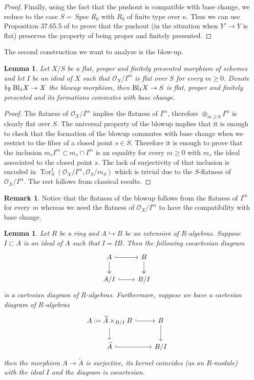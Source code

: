 \documentclass{alggeom}
\numberwithin{equation}{section}
\numberwithin{subsection}{section}
\newtheorem{lemma}[theorem]{Lemma}
\theoremstyle{definition}
\newtheorem{remark}[theorem]{Remark}
\theoremstyle{remark}
\newcommand\cO{\mathcal{O}} \newcommand\cP{\mathcal{P}}
\newcommand\into{\hookrightarrow}
\newcommand\tor{\operatorname{Tor}}
\newcommand\spec{\operatorname{Spec}}
\begin{document}
\begin{proof}
	Finally, using the fact that the pushout is compatible with base change, we reduce to the case $S=\spec R_0$ with $R_0$ of finite type over $\kappa$. Thus we can use Proposition 37.65.5 of \cite{StProj} to prove that the pushout (in the situation when $Y'\rightarrow Y$ is flat) preserves the property of being proper and finitely presented.
\end{proof}

The second construction we want to analyze is the blow-up.

\begin{lemma}\label{lem:blowup}
	Let $X/S$ be a flat, proper and finitely presented morphism of schemes and let $I$ be an ideal of $X$ such that $\cO_{X}/I^{m}$ is flat over $S$ for every $m\geq 0$. Denote by ${\rm Bl}_IX\rightarrow X$ the blowup morphism, then ${\rm Bl}_IX \rightarrow S$ is flat, proper and  finitely presented and its formations commutes with base change.
\end{lemma}

\begin{proof}
	The flatness of $\cO_X/I^m$ implies the flatness of $I^m$, therefore $\oplus_{m\geq 0}I^m$ is clearly flat over $S$. The universal property of the blowup implies that it is enough to check that the formation of the blowup commutes with base change when we restrict to the fiber of a closed point $s \in S$. Therefore it is enough to prove that the inclusion $m_sI^m\subset m_s\cap I^m$ is an equality for every $m\geq 0$ with $m_s$ the ideal associated to the closed point $s$. The lack of surjectivity of that inclusion is encoded in $\tor_S^1(\cO_X/I^m,\cO_S/m_S)$ which is trivial due to the $S$-flatness of $\cO_X/I^m$. The rest follows from classical results.
\end{proof}
\begin{remark}
	Notice that the flatness of the blowup follows from the flatness of $I^m$ for every $m$ whereas we need the flatness of $\cO_X/I^m$ to have the compatibility with base change.
\end{remark}
\begin{lemma}\label{lem:cond-diag}
	Let $R$ be a ring and $A\into B$ be an extension of $R$-algebras. Suppose $I\subset A$ is an ideal of $A$ such that $I=IB$. Then the following cocartesian diagram
	$$
	\begin{tikzcd}
		A \arrow[r, hook] \arrow[d, two heads] & B \arrow[d, two heads] \\
		A/I \arrow[r, hook]                    & B/I                   
	\end{tikzcd}
	$$
	is a cartesian diagram of $R$-algebras. Furthermore, suppose we have a cartesian diagram of $R$-algebras
	$$
	\begin{tikzcd}
		A:=\widetilde{A}\times_{B/I}B \arrow[d] \arrow[r, hook] & B \arrow[d] \\
		\widetilde{A} \arrow[r, hook]                       & B/I                      
	\end{tikzcd}
	$$
	then the morphism $A\rightarrow \widetilde{A}$ is surjective, its kernel coincides (as an $R$-module) with the ideal $I$ and the diagram is cocartesian.
\end{lemma}
\end{document}
